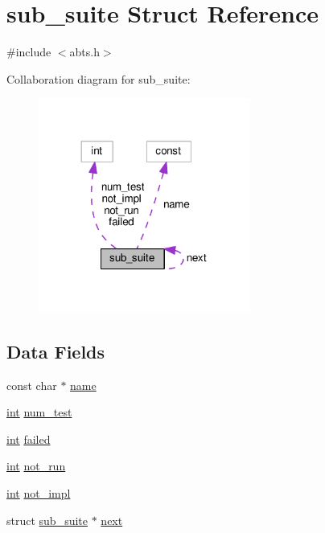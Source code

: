 \hypertarget{structsub__suite}{}\section{sub\+\_\+suite Struct Reference}
\label{structsub__suite}


{\ttfamily \#include $<$abts.\+h$>$}



Collaboration diagram for sub\+\_\+suite\+:
\nopagebreak
\begin{figure}[H]
\begin{center}
\leavevmode
\includegraphics[width=197pt]{structsub__suite__coll__graph}
\end{center}
\end{figure}
\subsection*{Data Fields}
\begin{DoxyCompactItemize}
\item 
const char $\ast$ \hyperlink{structsub__suite_a5f327cbdd34c3ee31b183235ef727f5f}{name}
\item 
\hyperlink{pcre_8txt_a42dfa4ff673c82d8efe7144098fbc198}{int} \hyperlink{structsub__suite_a6093827736a60fc08bf3bfcf9e3da403}{num\+\_\+test}
\item 
\hyperlink{pcre_8txt_a42dfa4ff673c82d8efe7144098fbc198}{int} \hyperlink{structsub__suite_a556b08e37f50e73f6f189cf29ee4a32a}{failed}
\item 
\hyperlink{pcre_8txt_a42dfa4ff673c82d8efe7144098fbc198}{int} \hyperlink{structsub__suite_a835c7fbf0595e4f2e0ace47452d9d4eb}{not\+\_\+run}
\item 
\hyperlink{pcre_8txt_a42dfa4ff673c82d8efe7144098fbc198}{int} \hyperlink{structsub__suite_a55c4fb6defb8da2e37217589e5b1c7f1}{not\+\_\+impl}
\item 
struct \hyperlink{structsub__suite}{sub\+\_\+suite} $\ast$ \hyperlink{structsub__suite_a5b852df3a9fc6b3761a2b4bb062a0c5b}{next}
\end{DoxyCompactItemize}


